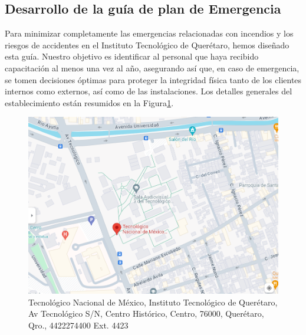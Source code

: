     \subsection{Desarrollo de la guía de plan de Emergencia}
    Para minimizar completamente las emergencias relacionadas con incendios y los riesgos de accidentes en el Instituto Tecnológico de Querétaro, hemos diseñado esta guía. Nuestro objetivo es identificar al personal que haya recibido capacitación al menos una vez al año, asegurando así que, en caso de emergencia, se tomen decisiones óptimas para proteger la integridad física tanto de los clientes internos como externos, así como de las instalaciones. Los detalles generales del establecimiento están resumidos en la Figura\ref{fig:mapa-itq}.
    \begin{figure}[H]
        \centering
        \includegraphics[scale=0.30]{24/Img/mapa-itq.png}
        \caption{Tecnológico Nacional de México, Instituto Tecnológico de Querétaro, Av Tecnológico S/N, Centro Histórico, Centro, 76000, Querétaro, Qro., 4422274400 Ext. 4423}
        \label{fig:mapa-itq}
    \end{figure}
